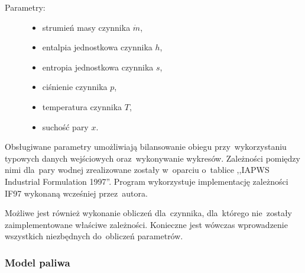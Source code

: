 \begin{description}

	\item[Parametry:] \hfill

		\begin{itemize}

			\item strumień masy czynnika $\dot m$,

			\item entalpia jednostkowa czynnika $h$,

			\item entropia jednostkowa czynnika $s$,

			\item ciśnienie czynnika $p$,

			\item temperatura czynnika $T$,

			\item suchość pary $x$.

		\end{itemize}

\end{description}

Obsługiwane parametry umożliwiają bilansowanie obiegu przy~wykorzystaniu
typowych danych wejściowych oraz~wykonywanie wykresów. Zależności
pomiędzy nimi dla~pary wodnej zrealizowane zostały w~oparciu o~tablice
,,IAPWS Industrial Formulation 1997''. Program wykorzystuje
implementację zależności IF97 wykonaną wcześniej przez~autora.

Możliwe jest również wykonanie obliczeń dla~czynnika, dla~którego
nie~zostały zaimplementowane właściwe zależności. Konieczne jest wówczas
wprowadzenie wszystkich niezbędnych do~obliczeń parametrów.


\subsubsection{Model paliwa}

